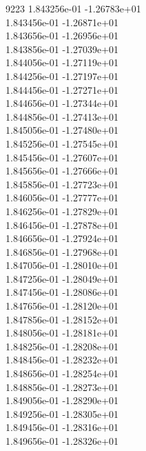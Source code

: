 9223	1.843256e-01	-1.26783e+01	\\ 	1.843456e-01	-1.26871e+01	\\ 	1.843656e-01	-1.26956e+01	\\ 	1.843856e-01	-1.27039e+01	\\ 	1.844056e-01	-1.27119e+01	\\ 	1.844256e-01	-1.27197e+01	\\ 	1.844456e-01	-1.27271e+01	\\ 	1.844656e-01	-1.27344e+01	\\ 	1.844856e-01	-1.27413e+01	\\ 	1.845056e-01	-1.27480e+01	\\ 	1.845256e-01	-1.27545e+01	\\ 	1.845456e-01	-1.27607e+01	\\ 	1.845656e-01	-1.27666e+01	\\ 	1.845856e-01	-1.27723e+01	\\ 	1.846056e-01	-1.27777e+01	\\ 	1.846256e-01	-1.27829e+01	\\ 	1.846456e-01	-1.27878e+01	\\ 	1.846656e-01	-1.27924e+01	\\ 	1.846856e-01	-1.27968e+01	\\ 	1.847056e-01	-1.28010e+01	\\ 	1.847256e-01	-1.28049e+01	\\ 	1.847456e-01	-1.28086e+01	\\ 	1.847656e-01	-1.28120e+01	\\ 	1.847856e-01	-1.28152e+01	\\ 	1.848056e-01	-1.28181e+01	\\ 	1.848256e-01	-1.28208e+01	\\ 	1.848456e-01	-1.28232e+01	\\ 	1.848656e-01	-1.28254e+01	\\ 	1.848856e-01	-1.28273e+01	\\ 	1.849056e-01	-1.28290e+01	\\ 	1.849256e-01	-1.28305e+01	\\ 	1.849456e-01	-1.28316e+01	\\ 	1.849656e-01	-1.28326e+01	\\ \hline
